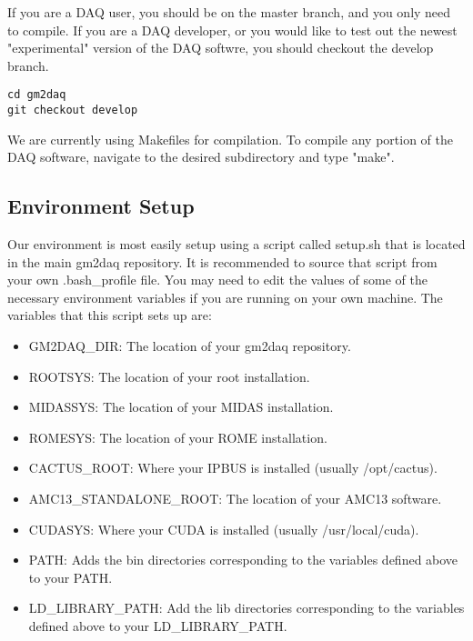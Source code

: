 If you are a DAQ user, you should be on the master branch, and you only need to compile. If you are a DAQ developer, or you would like to test out the newest "experimental" version of the DAQ softwre, you should checkout the develop branch.

\begin{verbatim}
cd gm2daq
git checkout develop
\end{verbatim}

We are currently using Makefiles for compilation. To compile any portion of the DAQ software, navigate to the desired subdirectory and type "make".

\subsection{Environment Setup}

Our environment is most easily setup using a script called setup.sh that is located in the main gm2daq repository. It is recommended to source that script from your own .bash\_profile file. You may need to edit the values of some of the necessary environment variables if you are running on your own machine. The variables that this script sets up are:

\begin{itemize}
\item GM2DAQ\_DIR: The location of your gm2daq repository.
\item ROOTSYS: The location of your root installation.
\item MIDASSYS: The location of your MIDAS installation.
\item ROMESYS: The location of your ROME installation.
\item CACTUS\_ROOT: Where your IPBUS is installed (usually /opt/cactus).
\item AMC13\_STANDALONE\_ROOT: The location of your AMC13 software.
\item CUDASYS: Where your CUDA is installed (usually /usr/local/cuda).
\item PATH: Adds the bin directories corresponding to the variables defined above to your PATH.
\item LD\_LIBRARY\_PATH: Add the lib directories corresponding to the variables defined above to your LD\_LIBRARY\_PATH.
\end{itemize}

